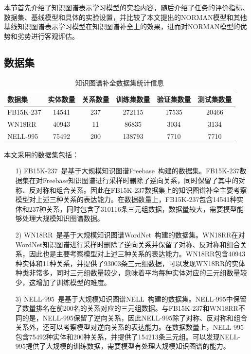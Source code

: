 \documentclass[algorithmlist, AutoFakeBold, AutoFakeSlant, figurelist, tablelist, nomlist, engineering]{seuthesix}
\begin{document}
本节首先介绍了知识图谱表示学习模型的实验内容，随后介绍了任务的评价指标、数据集、基线模型和具体的实验设置，并比较了本文提出的NORMAN模型和其他基线知识图谱表示学习模型在知识图谱补全上的效果，进而对NORMAN模型的优势和劣势进行客观评估。

\subsection{数据集}
\begin{table}[t]
  \centering
  \caption{知识图谱补全数据集统计信息}
  \begin{tabular*}{0.95\textwidth}{@{\extracolsep{\fill}}lccccc}
    \toprule[1pt]
    数据集 & 实体数量 & 关系数量 & 训练集数量 & 验证集数量 & 测试集数量 \\ \hline
    FB15K-237 & 14541 & 237 & 272115 & 17535 & 20466\\
    WN18RR & 40943 & 11 & 86835 & 3034 & 3134\\
    NELL-995 & 75492 & 200 & 138793 & 7710 & 7710\\
    \bottomrule[1pt]
	\end{tabular*}
  \label{Datasets1}
\end{table}

本文采用的数据集包括：
\begin{itemize}
  \item [1)]FB15K-237~\cite{toutanova2015representing}是基于大规模知识图谱Freebase~\cite{bollacker2008freebase}构建的数据集。FB15K-237数据集在对Freebase知识图谱进行采样时删除了逆向关系，同时保留了其中的对称、反对称和组合关系。因此在FB15K-237数据集上的知识图谱补全主要考察模型对上述三种关系的表达能力。在数据数量上，FB15K-237包含14541种实体和237种关系，同时包含了310116条三元组数据，数据量较大，需要模型能够处理大规模知识图谱数据。
  \item [2)]WN18RR~\cite{dettmers2018convolutional}是基于大规模知识图谱WordNet~\cite{glorot2010understanding}构建的数据集。WN18RR在对WordNet知识图谱进行采样时删除了逆向关系并保留了对称、反对称和组合关系，因此也是主要考察模型对上述三种关系的表达能力。WN18RR包含40943种实体和11种关系，并提供了93003条三元组数据，可以发现WN18RR的实体种类非常多，同时三元组数量较少，意味着平均每种实体对应的三元组数量较少，这增加了训练模型的难度。
  \item [3)]NELL-995~\cite{xiong2017deeppath}是基于大规模知识图谱NELL~\cite{carlson2010toward}构建的数据集。NELL-995中保留了数量排名在前200名的关系对应的三元组数据。与FB15K-237和WN18RR不同的是，NELL-995保留了逆向关系，因此NELL-995除了对称、反对称和组合关系外，还可以考察模型对逆向关系的表达能力。在数据数量上，NELL-995包含75492种实体和200种关系，并提供了154213条三元组。可以发现NELL-995提供了大规模的训练数据，需要模型有处理大规模知识图谱的能力。
\end{itemize}
\end{document}
